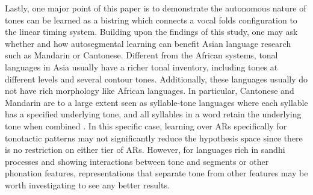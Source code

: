 \documentclass[11pt,letterpaper]{article}
\begin{document}
Lastly, one major point of this paper is to demonstrate the autonomous nature of tones can be learned as a bistring which connects a vocal folds configuration to the linear timing system. Building upon the findings of this study, one may ask whether and how autosegmental learning can benefit Asian language research such as Mandarin or Cantonese. Different from the African systems, tonal languages in Asia usually have a richer tonal inventory, including tones at different levels and several contour tones. Additionally, these languages usually do not have rich morphology like African languages. In particular, Cantonese and Mandarin are to a large extent seen as syllable-tone languages where each syllable has a specified underlying tone, and all syllables in a word retain the underlying tone when combined \citep{yip2002tone}. In this specific case, learning over ARs specifically for tonotactic patterns may not significantly reduce the hypothesis space since there is no restriction on either tier of ARs. However, for languages rich in sandhi processes and showing interactions between tone and segments or other phonation features, representations that separate tone from other features may be worth investigating to see any better results.


\appendix
\end{document}

